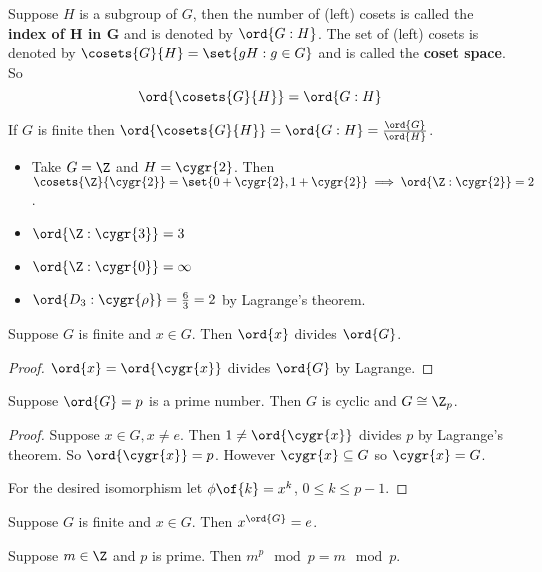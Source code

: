\begin{definition}
    Suppose $H$ is a subgroup of $G$, then the number of (left) cosets is called the \textbf{index of H in G} and is denoted by $\ord{G:H}$. The set of (left) cosets is denoted by $\cosets{G}{H} = \set{gH: g \in G}$ and is called the \textbf{coset space}. So \[\ord{\cosets{G}{H}} = \ord{G:H}\]
\end{definition}

\begin{example}
    If $G$ is finite then $\ord{\cosets{G}{H}} = \ord{G:H} = \frac{\ord{G}}{\ord{H}}$.
    \begin{itemize}
        \item Take $G = \Z$ and $H = \cygr{2}$. Then $\cosets{\Z}{\cygr{2}} = \set{0 + \cygr{2}, 1+ \cygr{2}} \implies \ord{\Z:\cygr{2}} = 2$.
        \item $\ord{\Z :\cygr{3}} = 3$
        \item $\ord{\Z :\cygr{0}} = \infty$
        \item $\ord{D_3 : \cygr{\rho}} = \frac{6}{3} = 2$ by Lagrange's theorem.
    \end{itemize}
\end{example}

\begin{corollary}
    Suppose $G$ is finite and $x \in G$. Then $\ord{x}$ divides $\ord{G}$.
\end{corollary}
\begin{proof}
    $\ord{x} = \ord{\cygr{x}}$ divides $\ord{G}$ by Lagrange.
\end{proof}

\begin{corollary}
    Suppose $\ord{G} = p$ is a prime number. Then $G$ is cyclic and $G \cong \Z_p$.
\end{corollary}
\begin{proof}
    Suppose $x \in G, x \neq e$. Then $1 \neq \ord{\cygr{x}}$ divides $p$ by Lagrange's theorem. So $\ord{\cygr{x}} = p$. However $\cygr{x} \subseteq G$ so $\cygr{x} = G$.

    For the desired isomorphism let $\phi\of{k} = x^k$, $0 \leq k \leq p-1$.
\end{proof}

\begin{corollary}
    Suppose $G$ is finite and $x \in G$. Then $x^{\ord{G}} = e$.
\end{corollary}

\begin{corollary}
    Suppose $m \in \Z$ and $p$ is prime. Then $m^p \mod p = m \mod p$.
\end{corollary}

